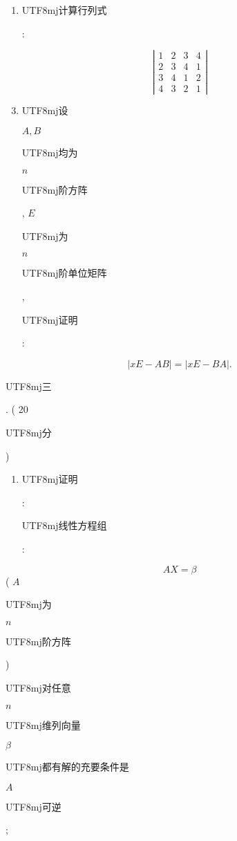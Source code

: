 \documentclass[10pt]{article}
\begin{document}
\begin{enumerate}
  \item \begin{CJK}{UTF8}{mj}计算行列式\end{CJK}:
\end{enumerate}
$$
\left|\begin{array}{llll}
1 & 2 & 3 & 4 \\
2 & 3 & 4 & 1 \\
3 & 4 & 1 & 2 \\
4 & 3 & 2 & 1
\end{array}\right|
$$

\begin{enumerate}
  \setcounter{enumi}{2}
  \item \begin{CJK}{UTF8}{mj}设\end{CJK} $A, B$ \begin{CJK}{UTF8}{mj}均为\end{CJK} $n$ \begin{CJK}{UTF8}{mj}阶方阵\end{CJK}, $E$ \begin{CJK}{UTF8}{mj}为\end{CJK} $n$ \begin{CJK}{UTF8}{mj}阶单位矩阵\end{CJK}, \begin{CJK}{UTF8}{mj}证明\end{CJK}:
\end{enumerate}
$$
|x E-A B|=|x E-B A| .
$$
\begin{CJK}{UTF8}{mj}三\end{CJK}. ( 20 \begin{CJK}{UTF8}{mj}分\end{CJK})

\begin{enumerate}
  \item \begin{CJK}{UTF8}{mj}证明\end{CJK}: \begin{CJK}{UTF8}{mj}线性方程组\end{CJK}:
\end{enumerate}
$$
A X=\beta
$$
( $A$ \begin{CJK}{UTF8}{mj}为\end{CJK} $n$ \begin{CJK}{UTF8}{mj}阶方阵\end{CJK}) \begin{CJK}{UTF8}{mj}对任意\end{CJK} $n$ \begin{CJK}{UTF8}{mj}维列向量\end{CJK} $\beta$ \begin{CJK}{UTF8}{mj}都有解的充要条件是\end{CJK} $A$ \begin{CJK}{UTF8}{mj}可逆\end{CJK};
\end{document}
